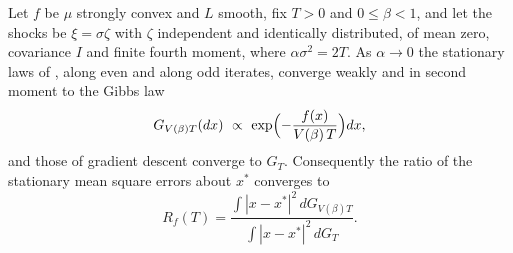 \begin{theorem}\label{thm:ch7:temperature}
Let $f$ be $\mu$ strongly convex and $L$ smooth, fix $T>0$ and $0\le\beta<1$, and let the shocks be $\xi=\sigma\zeta$ with $\zeta$ independent and identically distributed, of mean zero, covariance $I$ and finite fourth moment, where $\alpha\sigma^2=2T$. As $\alpha\to0$ the stationary laws of \smmdet, along even and along odd iterates, converge weakly and in second moment to the Gibbs law
\[
  G_{V(\beta)T}(dx)\ \propto\ \exp\Bigl(-\frac{f(x)}{V(\beta)\,T}\Bigr)dx ,
\]
and those of gradient descent converge to $G_T$. Consequently the ratio of the stationary mean square errors about $x^\ast$ converges to
\[
  R_f(T)=\frac{\int|x-x^\ast|^2\,dG_{V(\beta)T}}{\int|x-x^\ast|^2\,dG_T} .
\]
\end{theorem}

